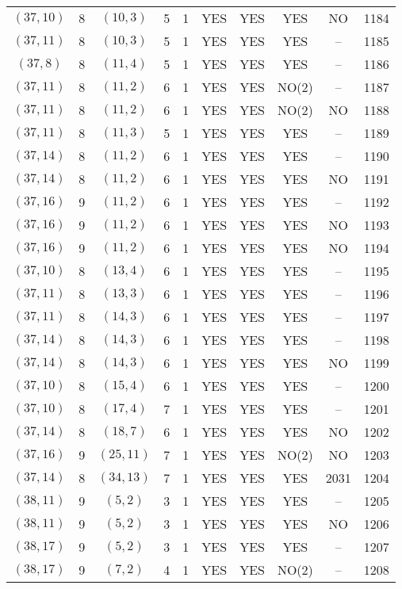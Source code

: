 \begin{longtable}{|c|c|c|c|c|c|c|c|c|c|}
$(37, 10)$ & 8 & $(10, 3)$ & 5 & 1 & YES & YES & YES & NO & 1184\\
$(37, 11)$ & 8 & $(10, 3)$ & 5 & 1 & YES & YES & YES & -- & 1185\\
$(37, 8)$ & 8 & $(11, 4)$ & 5 & 1 & YES & YES & YES & -- & 1186\\
$(37, 11)$ & 8 & $(11, 2)$ & 6 & 1 & YES & YES & NO(2) & -- & 1187\\
$(37, 11)$ & 8 & $(11, 2)$ & 6 & 1 & YES & YES & NO(2) & NO & 1188\\
$(37, 11)$ & 8 & $(11, 3)$ & 5 & 1 & YES & YES & YES & -- & 1189\\
$(37, 14)$ & 8 & $(11, 2)$ & 6 & 1 & YES & YES & YES & -- & 1190\\
$(37, 14)$ & 8 & $(11, 2)$ & 6 & 1 & YES & YES & YES & NO & 1191\\
$(37, 16)$ & 9 & $(11, 2)$ & 6 & 1 & YES & YES & YES & -- & 1192\\
$(37, 16)$ & 9 & $(11, 2)$ & 6 & 1 & YES & YES & YES & NO & 1193\\
$(37, 16)$ & 9 & $(11, 2)$ & 6 & 1 & YES & YES & YES & NO & 1194\\
$(37, 10)$ & 8 & $(13, 4)$ & 6 & 1 & YES & YES & YES & -- & 1195\\
$(37, 11)$ & 8 & $(13, 3)$ & 6 & 1 & YES & YES & YES & -- & 1196\\
$(37, 11)$ & 8 & $(14, 3)$ & 6 & 1 & YES & YES & YES & -- & 1197\\
$(37, 14)$ & 8 & $(14, 3)$ & 6 & 1 & YES & YES & YES & -- & 1198\\
$(37, 14)$ & 8 & $(14, 3)$ & 6 & 1 & YES & YES & YES & NO & 1199\\
$(37, 10)$ & 8 & $(15, 4)$ & 6 & 1 & YES & YES & YES & -- & 1200\\
$(37, 10)$ & 8 & $(17, 4)$ & 7 & 1 & YES & YES & YES & -- & 1201\\
$(37, 14)$ & 8 & $(18, 7)$ & 6 & 1 & YES & YES & YES & NO & 1202\\
$(37, 16)$ & 9 & $(25, 11)$ & 7 & 1 & YES & YES & NO(2) & NO & 1203\\
$(37, 14)$ & 8 & $(34, 13)$ & 7 & 1 & YES & YES & YES & 2031 & 1204\\
$(38, 11)$ & 9 & $(5, 2)$ & 3 & 1 & YES & YES & YES & -- & 1205\\
$(38, 11)$ & 9 & $(5, 2)$ & 3 & 1 & YES & YES & YES & NO & 1206\\
$(38, 17)$ & 9 & $(5, 2)$ & 3 & 1 & YES & YES & YES & -- & 1207\\
$(38, 17)$ & 9 & $(7, 2)$ & 4 & 1 & YES & YES & NO(2) & -- & 1208\\

\end{longtable}
